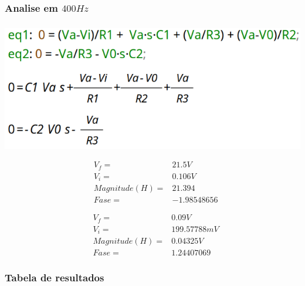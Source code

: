 \documentclass[12pt,twoside, a4paper, twocolumn]{article}
\begin{document}
\subsubsection{Analise em $400Hz$}
\subparagraph*{}


\begin{adjustbox}{scale=0.18}
    \includegraphics{eqs.png}
\end{adjustbox}


\begin{equation*}
    \begin{aligned}
         & V_f =          & 21.5V       \\
         & V_i =          & 0.106V      \\
         & Magnitude(H) = & 21.394      \\
         & Fase =         & -1.98548656
    \end{aligned}
\end{equation*}


\begin{equation*}
    \begin{aligned}
         & V_f =          & 0.09V       \\
         & V_i =          & 199.57788mV \\
         & Magnitude(H) = & 0.04325V    \\
         & Fase =         & 1.24407069
    \end{aligned}
\end{equation*}


\subsubsection{Tabela de resultados}


\subparagraph*{}
\end{document}
